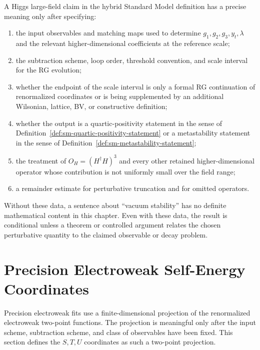 \begin{definition}
\label{def:sm-higgs-large-field-claim-data}
A Higgs large-field claim in the hybrid Standard Model definition has a
precise meaning only after specifying:
\begin{enumerate}
\item the input observables and matching maps used to determine
      \(g_1,g_2,g_3,y_t,\lambda\) and the relevant higher-dimensional
      coefficients at the reference scale;
\item the subtraction scheme, loop order, threshold convention, and scale
      interval for the RG evolution;
\item whether the endpoint of the scale interval is only a formal RG
      continuation of renormalized coordinates or is being supplemented by an
      additional Wilsonian, lattice, BV, or constructive definition;
\item whether the output is a quartic-positivity statement in the sense of
      Definition~\ref{def:sm-quartic-positivity-statement} or a metastability
      statement in the sense of
      Definition~\ref{def:sm-metastability-statement};
\item the treatment of \(O_H=(H^\dagger H)^3\) and every other retained
      higher-dimensional operator whose contribution is not uniformly small
      over the field range;
\item a remainder estimate for perturbative truncation and for omitted
      operators.
\end{enumerate}
Without these data, a sentence about ``vacuum stability'' has no definite
mathematical content in this chapter.  Even with these data, the result is
conditional unless a theorem or controlled argument relates the chosen
perturbative quantity to the claimed observable or decay problem.
\end{definition}

\section{Precision Electroweak Self-Energy Coordinates}

Precision electroweak fits use a finite-dimensional projection of the
renormalized electroweak two-point functions.  The projection is meaningful
only after the input scheme, subtraction scheme, and class of observables have
been fixed.  This section defines the \(S,T,U\) coordinates as such a
two-point projection.

